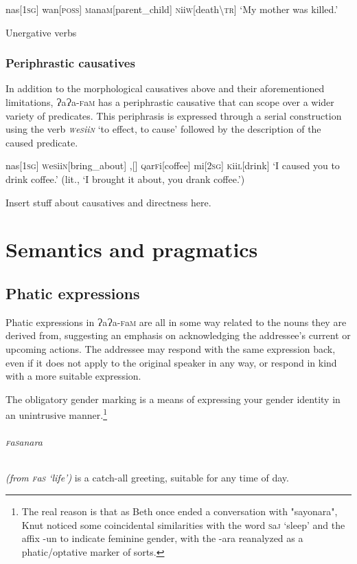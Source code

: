 \documentclass[a4paper,10pt,twoside,openright]{memoir}
\newcommand{\lang}{{\bigglot}a{\bigglot}a-\textsc{f}a\textsc{m}}
\newcommand{\bigglot}{Ɂ}
\newcommand{\famwordold}[5]{#1\textsc{#2}#3\textsc{#4}#5}
\begin{document}
\ex
\begingl
nas[\textsc{1sg}]
wan[\textsc{poss}]
\famwordold{}{m}{ana}{m}{}[parent\_child]
\famwordold{}{n}{ii}{w}{}[death\textbackslash\textsc{tr}]
\glft `My mother was killed.'
\endgl
\xe

Unergative verbs

\subsection{Periphrastic causatives}

In addition to the morphological causatives above and their aforementioned limitations, \lang{} has a periphrastic causative that can scope over a wider variety of predicates. This periphrasis is expressed through a serial construction using the verb \textit{\textsc{w}\famwordold{e}{s}{ii}{n}{}} `to effect, to cause' followed by the description of the caused predicate. 

\ex
\begingl
nas[\textsc{1sg}]
\textsc{w}\famwordold{e}{s}{ii}{n}{}[bring\_about]
,[]
\famwordold{}{q}{ar}{f}{i}[coffee]
mi[\textsc{2sg}]
\famwordold{}{k}{ii}{l}{}[drink]
\glft `I caused you to drink coffee.' (lit., `I brought it about, you drank coffee.')
\endgl
\xe

Insert stuff about causatives and directness here.

\chapter{Semantics and pragmatics}
\section{Phatic expressions}

Phatic expressions in \lang{} are all in some way related to the nouns they are derived from, suggesting an emphasis on acknowledging the addressee's current or upcoming actions. The addressee may respond with the same expression back, even if it does not apply to the original speaker in any way, or respond in kind with a more suitable expression.

The obligatory gender marking is a means of expressing your gender identity in an unintrusive manner.\footnote{The real reason is that as Beth once ended a conversation with "sayonara", Knut noticed some coincidental similarities with the word \famwordold{}{s}{a}{j}{} `sleep' and the affix -un to indicate feminine gender, with the -ara reanalyzed as a phatic/optative marker of sorts.}

\subparagraph{\famwordold{}{f}{a}{s}{anara}} \textit{(from \famwordold{}{f}{a}{s}{} `life')} is a catch-all greeting, suitable for any time of day. 
\end{document}

